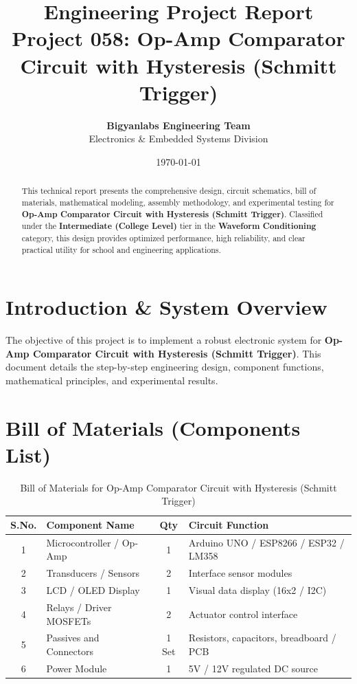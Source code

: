 \documentclass[11pt,a4paper]{article}
\title{\textbf{\Huge Engineering Project Report}\\[0.5em] \Large Project 058: Op-Amp Comparator Circuit with Hysteresis (Schmitt Trigger)}
\author{\textbf{Bigyanlabs Engineering Team}\\ Electronics \& Embedded Systems Division}
\date{\today}
\begin{document}
\maketitle
\thispagestyle{empty}

\begin{abstract}
This technical report presents the comprehensive design, circuit schematics, bill of materials, mathematical modeling, assembly methodology, and experimental testing for \textbf{Op-Amp Comparator Circuit with Hysteresis (Schmitt Trigger)}. Classified under the \textbf{Intermediate (College Level)} tier in the \textbf{Waveform Conditioning} category, this design provides optimized performance, high reliability, and clear practical utility for school and engineering applications.
\end{abstract}

\newpage
\tableofcontents
\newpage

\section{Introduction \& System Overview}
The objective of this project is to implement a robust electronic system for \textbf{Op-Amp Comparator Circuit with Hysteresis (Schmitt Trigger)}. This document details the step-by-step engineering design, component functions, mathematical principles, and experimental results.

\section{Bill of Materials (Components List)}
\begin{table}[h!]
\centering
\caption{Bill of Materials for Op-Amp Comparator Circuit with Hysteresis (Schmitt Trigger)}
\vspace{0.5em}
\begin{tabular}{clcp{7cm}}
\toprule
\textbf{S.No.} & \textbf{Component Name} & \textbf{Qty} & \textbf{Circuit Function} \\
\midrule
1 & Microcontroller / Op-Amp & 1 & Arduino UNO / ESP8266 / ESP32 / LM358 \\
2 & Transducers / Sensors & 2 & Interface sensor modules \\
3 & LCD / OLED Display & 1 & Visual data display (16x2 / I2C) \\
4 & Relays / Driver MOSFETs & 2 & Actuator control interface \\
5 & Passives and Connectors & 1 Set & Resistors, capacitors, breadboard / PCB \\
6 & Power Module & 1 & 5V / 12V regulated DC source \\
\bottomrule
\end{tabular}
\end{table}
\end{document}
